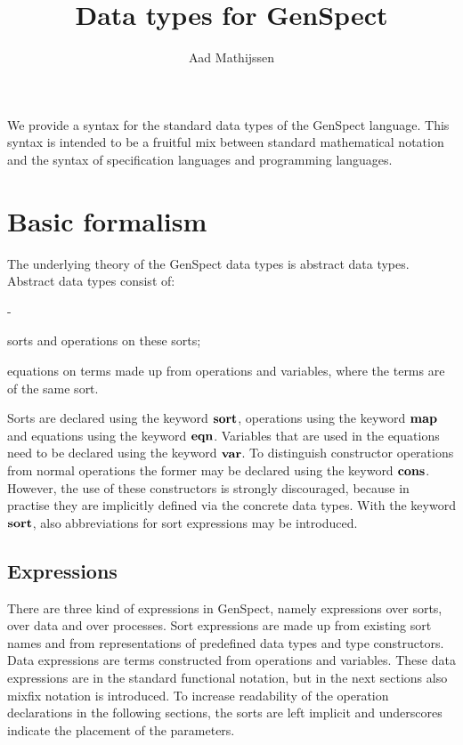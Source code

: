 \documentclass[a4paper,fleqn]{article}
\title{Data types for GenSpect}
\author{Aad Mathijssen}
\newenvironment{tdefinitions}[2][0.15em]
  {\begin{list}%
    {#2}%
    {\setlength{\parsep}{0pt}%
     \setlength{\itemsep}{#1}%
     \setlength{\leftmargin}{\mathindent}%
     \setlength{\labelwidth}{\mathindent - \labelsep}%
    }
  }
  {\end{list}}
\newcommand{\frm}[1]{\mbox{\ensuremath{#1}}}
\newlength{\tlength}
\newcommand{\kwsort}{{\bf sort}}
\newcommand{\kwcons}{{\bf cons}}
\newcommand{\kwmap}{{\bf map}}
\newcommand{\kwvar}{{\bf var}}
\newcommand{\kweqn}{{\bf eqn}}
\begin{document}
\maketitle

\noindent
We provide a syntax for the standard data types of the GenSpect language. This
syntax is intended to be a fruitful mix between standard mathematical notation
and the syntax of specification languages and programming languages.

\section{Basic formalism}

The underlying theory of the GenSpect data types is abstract data types.
Abstract data types consist of:
\begin{tdefinitions}{-}
\item sorts and operations on these sorts;
\item equations on terms made up from operations and variables, where the terms
      are of the same sort.
\end{tdefinitions}

\noindent
Sorts are declared using the keyword \frm{\kwsort}, operations using the
keyword \frm{\kwmap} and equations using the keyword \frm{\kweqn}. Variables
that are used in the equations need to be declared using the keyword
\frm{\kwvar}. To distinguish constructor operations from normal operations the
former may be declared using the keyword \frm{\kwcons}. However, the use of
these constructors is strongly discouraged, because in practise they are
implicitly defined via the concrete data types. With the keyword \frm{\kwsort},
also abbreviations for sort expressions may be introduced.

\subsection{Expressions}

There are three kind of expressions in GenSpect, namely expressions over sorts,
over data and over processes. Sort expressions are made up from existing sort
names and from representations of predefined data types and type constructors.
Data expressions are terms constructed from operations and variables. These
data expressions are in the standard functional notation, but in the next
sections also mixfix notation is introduced. To increase readability of the
operation declarations in the following sections, the sorts are left implicit
and underscores indicate the placement of the parameters.
\end{document}

